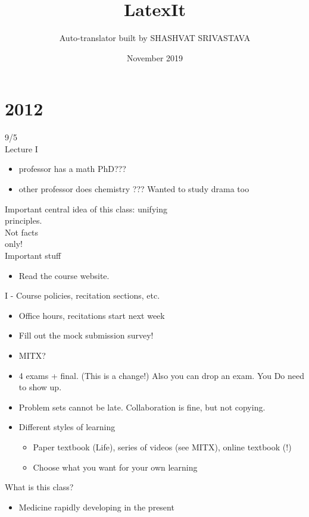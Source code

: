 \documentclass{article}
\title{LatexIt}
\author{Auto-translator built by SHASHVAT SRIVASTAVA}
\date{November 2019}
\begin{document}
\maketitle
\tableofcontents\newpage 
 \section{2012}9/5\\
Lecture I
\begin{itemize}
\item  professor has a math PhD???
\item  other professor does chemistry ??? Wanted to study drama too
\end{itemize}
Important central idea of this class: unifying\\
principles.\\
Not facts\\
only!\\
Important stuff
\begin{itemize}
\item  Read the course website.
\end{itemize}
I - Course policies, recitation sections, etc.
\begin{itemize}
\item  Office hours, recitations start next week
\item  Fill out the mock submission survey!
\end{itemize}
\begin{itemize}
\item  MITX?
\end{itemize}
\begin{itemize}
\item 4 exams + final. (This is a change!) Also you can drop an exam.
You Do need to show up.
\end{itemize}
\begin{itemize}
\item  Problem sets cannot be late. Collaboration is fine, but not copying.
\item  Different styles of learning
\begin{itemize}
\item  Paper textbook (Life), series of videos (see MITX), online textbook (!)
\item  Choose what you want for your own learning
\end{itemize}
\end{itemize}
What is this class?
\begin{itemize}
\item  Medicine rapidly developing in the present
\end{itemize}
\end{document}
